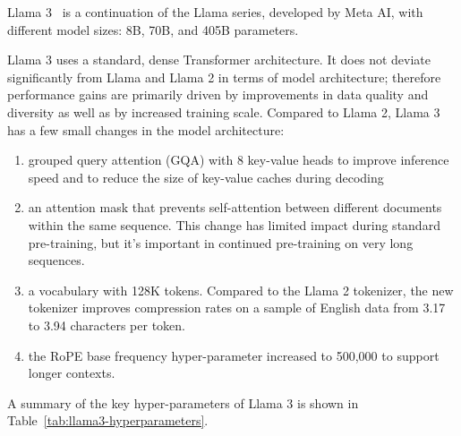 Llama 3~\cite{llama3} is a continuation of the Llama series, developed by Meta AI, with different model sizes: 8B, 70B, and 405B parameters.

Llama 3 uses a standard, dense Transformer architecture.
It does not deviate significantly from Llama and Llama 2 in terms of model architecture; therefore performance gains are primarily driven by improvements in data quality and diversity as well as by increased training scale.
Compared to Llama 2, Llama 3 has a few small changes in the model architecture:
\begin{enumerate}
	\item grouped query attention (GQA) with 8 key-value heads to improve inference speed and to reduce the size of key-value caches during decoding
	\item an attention mask that prevents self-attention between different documents within the same sequence.
	      This change has limited impact during standard pre-training, but it's important in continued pre-training on very long sequences.
	\item a vocabulary with 128K tokens.
	      Compared to the Llama 2 tokenizer, the new tokenizer improves compression rates on a sample of English data from 3.17 to 3.94 characters per token.
	\item the RoPE base frequency hyper-parameter increased to 500,000 to support longer contexts.
\end{enumerate}
A summary of the key hyper-parameters of Llama 3 is shown in Table~\ref{tab:llama3-hyperparameters}.

